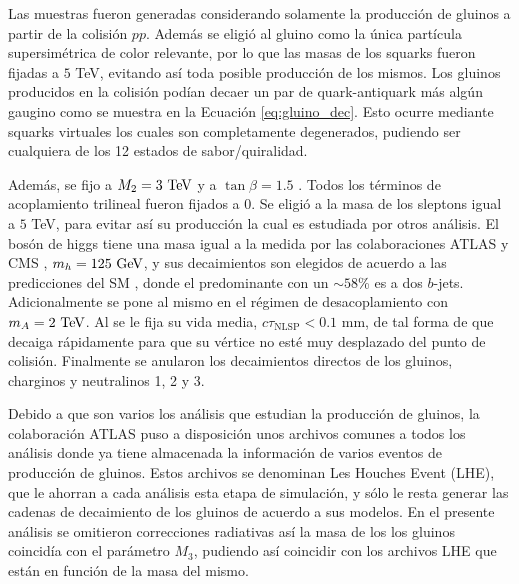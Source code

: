 Las muestras fueron generadas considerando solamente la producción de gluinos a partir de la colisión $pp$. Además se eligió al gluino como la única partícula supersimétrica de color relevante, por lo que las masas de los squarks fueron fijadas a $5$ TeV, evitando así toda posible producción de los mismos. Los gluinos producidos en la colisión podían decaer un par de quark-antiquark más algún gaugino como se muestra en la Ecuación \ref{eq:gluino_dec}. Esto ocurre mediante squarks virtuales los cuales son completamente degenerados, pudiendo ser cualquiera de los 12 estados de sabor/quiralidad.

Además, se fijo a $M_2=3\ \text{TeV}$ y a $\tan{\beta}=1.5$ . Todos los términos de acoplamiento trilineal fueron fijados a 0. Se eligió a la masa de los sleptons igual a $5$ TeV, para evitar así su producción la cual es estudiada por otros análisis. El bosón de higgs tiene una masa igual a la medida por las colaboraciones ATLAS y CMS \cite{higgs_mass}, $m_h=125\ \gev$, y sus decaimientos son elegidos de acuerdo a las predicciones del SM , donde el predominante con un $\sim58$\% es a dos $b$-jets.
Adicionalmente se pone al mismo en el régimen de desacoplamiento con $m_A = 2\ \text{TeV}$. Al \ninoone se le fija su vida media, $c\tau_{\text{NLSP}}<0.1$ mm, de tal forma de que decaiga rápidamente  para que su vértice no esté muy desplazado del punto de colisión. Finalmente se anularon los decaimientos directos de los gluinos, charginos y neutralinos 1, 2 y 3. 


Debido a que son varios los análisis que estudian la producción de gluinos, la colaboración ATLAS puso a disposición unos archivos comunes a todos los análisis donde ya tiene almacenada la información de varios eventos de producción de gluinos. Estos archivos se denominan Les Houches Event (LHE), que le ahorran a cada análisis esta etapa de simulación, y sólo le resta generar las cadenas de decaimiento de los gluinos de acuerdo a sus modelos. En el presente análisis se omitieron correcciones radiativas así la masa de los los gluinos coincidía con el parámetro $M_3$, pudiendo así coincidir con los archivos LHE que están en función de la masa del mismo.

